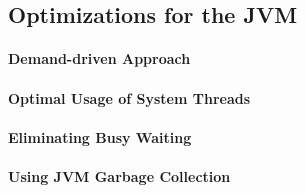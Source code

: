\subsection{Optimizations for the JVM}

\paragraph{Demand-driven Approach}

\paragraph{Optimal Usage of System Threads}

\paragraph{Eliminating Busy Waiting}

\paragraph{Using JVM Garbage Collection}
